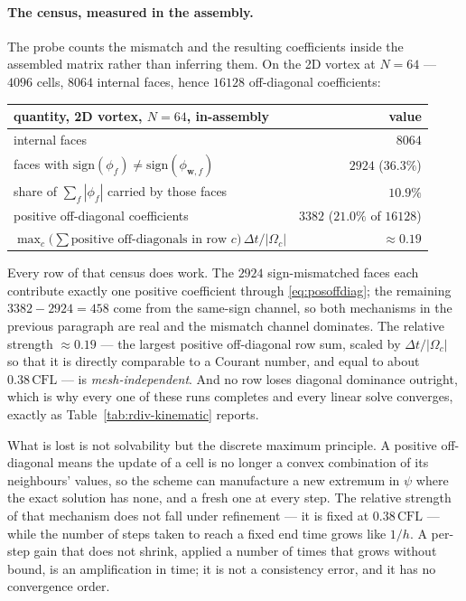\documentclass[preprint,3p,11pt]{elsarticle}
\newcommand{\psilev}{\psi}
\begin{document}
\paragraph{The census, measured in the assembly.} The probe counts the mismatch
and the resulting coefficients inside the assembled matrix rather than inferring
them. On the 2D vortex at $N=64$ --- $4096$ cells, $8064$ internal faces, hence
$16128$ off-diagonal coefficients:
\begin{center}
\begin{tabular}{lr}
\toprule
quantity, 2D vortex, $N=64$, in-assembly & value \\
\midrule
internal faces & $8064$ \\
faces with $\mathrm{sign}(\phi_f) \neq \mathrm{sign}(\phi_{\mathbf{w},f})$ & $2924$ \quad($36.3\%$) \\
share of $\sum_f|\phi_f|$ carried by those faces & $10.9\%$ \\
positive off-diagonal coefficients & $3382$ \quad($21.0\%$ of $16128$) \\
$\max_c\bigl(\sum \text{positive off-diagonals in row } c\bigr)\,\Delta t/|\Omega_c|$ & $\approx 0.19$ \\
\bottomrule
\end{tabular}
\end{center}
Every row of that census does work. The $2924$ sign-mismatched faces each contribute
exactly one positive coefficient through \eqref{eq:posoffdiag}; the remaining
$3382 - 2924 = 458$ come from the same-sign channel, so both mechanisms in the
previous paragraph are real and the mismatch channel dominates. The relative
strength $\approx0.19$ --- the largest positive off-diagonal row sum, scaled by
$\Delta t/|\Omega_c|$ so that it is directly comparable to a Courant number, and
equal to about $0.38\,\mathrm{CFL}$ --- is \emph{mesh-independent}. And no row
loses diagonal dominance outright, which is why every one of these runs completes
and every linear solve converges, exactly as Table~\ref{tab:rdiv-kinematic}
reports.

What is lost is not solvability but the discrete maximum principle. A positive
off-diagonal means the update of a cell is no longer a convex combination of its
neighbours' values, so the scheme can manufacture a new extremum in $\psilev$
where the exact solution has none, and a fresh one at every step. The relative
strength of that mechanism does not fall under refinement --- it is fixed at
$0.38\,\mathrm{CFL}$ --- while the number of steps taken to reach a fixed end time
grows like $1/h$. A per-step gain that does not shrink, applied a number of times
that grows without bound, is an amplification in time; it is not a consistency
error, and it has no convergence order.
\end{document}
